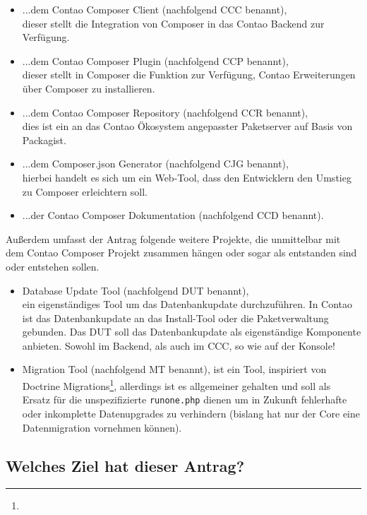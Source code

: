 \documentclass[
paper=a4,
draft=false,%
fontsize=10pt%
]{scrartcl}
\begin{document}
\begin{itemize}
\item ...dem Contao Composer Client (nachfolgend CCC benannt), \\
dieser stellt die Integration von Composer in das Contao Backend zur Verfügung.
\item ...dem Contao Composer Plugin (nachfolgend CCP benannt), \\
dieser stellt in Composer die Funktion zur Verfügung, Contao Erweiterungen über Composer zu installieren.
\item ...dem Contao Composer Repository (nachfolgend CCR benannt), \\
dies ist ein an das Contao Ökosystem angepasster Paketserver auf Basis von Packagist.
\item ...dem Composer.json Generator (nachfolgend CJG benannt), \\
hierbei handelt es sich um ein Web-Tool, dass den Entwicklern den Umstieg zu Composer erleichtern soll.
\item ...der Contao Composer Dokumentation (nachfolgend CCD benannt).
\end{itemize}

Außerdem umfasst der Antrag folgende weitere Projekte, die unmittelbar mit dem Contao Composer Projekt zusammen hängen oder sogar als  entstanden sind oder entstehen sollen.

\begin{itemize}
\item Database Update Tool (nachfolgend DUT benannt), \\
ein eigenständiges Tool um das Datenbankupdate durchzuführen. In Contao ist das Datenbankupdate an das Install-Tool oder die Paketverwaltung gebunden. Das DUT soll das Datenbankupdate als eigenständige Komponente anbieten. Sowohl im Backend, als auch im CCC, so wie auf der Konsole!
\item Migration Tool (nachfolgend MT benannt), ist ein Tool, inspiriert von Doctrine Migrations\footnote{}, allerdings ist es allgemeiner gehalten und soll als Ersatz für die unspezifizierte \texttt{runone.php} dienen um in Zukunft fehlerhafte oder inkomplette Datenupgrades zu verhindern (bislang hat nur der Core eine  Datenmigration vornehmen können).
\end{itemize}

\subsection*{Welches Ziel hat dieser Antrag?}
\end{document}
